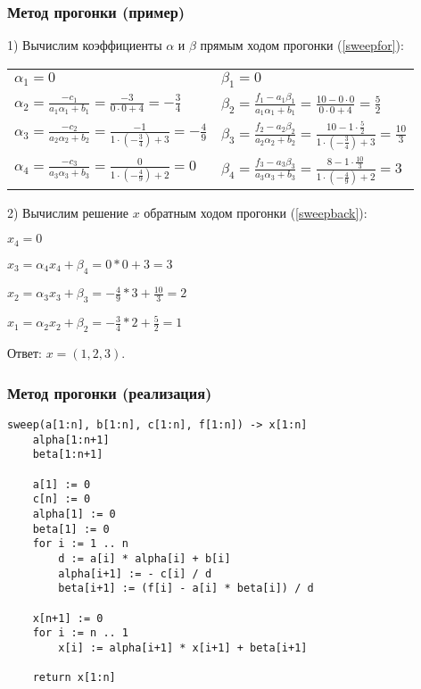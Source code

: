 \documentclass[10pt]{beamer}
\begin{document}
\begin{frame}[fragile]
\frametitle{Метод прогонки (пример)}

1) Вычислим коэффициенты $\alpha$ и $\beta$ прямым ходом прогонки (\ref{sweepfor}):

\begin{tabular}{ll}
$\alpha_1 = 0$ & $\beta_1 = 0$ 
\\

$\alpha_2 = \frac{- c_1}{a_1  \alpha_1 + b_1} = \frac{-3}{0 \cdot 0 + 4} = - \frac{3}{4}$ & 
$\beta_2 = \frac{f_1 - a_1 \beta_1}{a_1 \alpha_1 + b_1} = \frac{10 - 0 \cdot 0}{0 \cdot 0 + 4} = \frac{5}{2}$ 
\\

$\alpha_3 = \frac{- c_2}{a_2  \alpha_2 + b_2} = \frac{-1}{1 \cdot (- \frac{3}{4}) + 3} = - \frac{4}{9}$ &
$\beta_3 = \frac{f_2 - a_2 \beta_2}{a_2 \alpha_2 + b_2} = \frac{10 - 1 \cdot \frac{5}{2}}{1 \cdot (- \frac{3}{4}) + 3} = \frac{10}{3}$ \\

$\alpha_4 = \frac{- c_3}{a_3  \alpha_3 + b_3} = \frac{0}{1 \cdot (-\frac{4}{9}) + 2} = 0$ & 
$\beta_4 = \frac{f_3 - a_3 \beta_3}{a_3 \alpha_3 + b_3} = \frac{8 - 1 \cdot \frac{10}{3}}{1 \cdot (-\frac{4}{9}) + 2} = 3$
\\
\end{tabular}


2) Вычислим решение $x$ обратным ходом прогонки (\ref{sweepback}):

$x_4 = 0$

$x_3 = \alpha_4 x_4 + \beta_4 = 0 * 0 + 3 = 3$

$x_2 = \alpha_3 x_3 + \beta_3 = - \frac{4}{9} * 3 + \frac{10}{3} = 2$

$x_1 = \alpha_2 x_2 + \beta_2= - \frac{3}{4} * 2 + \frac{5}{2} = 1$

Ответ: $x = (1, 2, 3)$.

\end{frame}


\begin{frame}[fragile]
\frametitle{Метод прогонки (реализация)}

\begin{lstlisting}
sweep(a[1:n], b[1:n], c[1:n], f[1:n]) -> x[1:n]
	alpha[1:n+1]
	beta[1:n+1]

	a[1] := 0
	c[n] := 0
	alpha[1] := 0
	beta[1] := 0
	for i := 1 .. n
    	d := a[i] * alpha[i] + b[i]
    	alpha[i+1] := - c[i] / d
    	beta[i+1] := (f[i] - a[i] * beta[i]) / d

	x[n+1] := 0
	for i := n .. 1
    	x[i] := alpha[i+1] * x[i+1] + beta[i+1]

    return x[1:n]
\end{lstlisting}

\end{frame}
\end{document}

